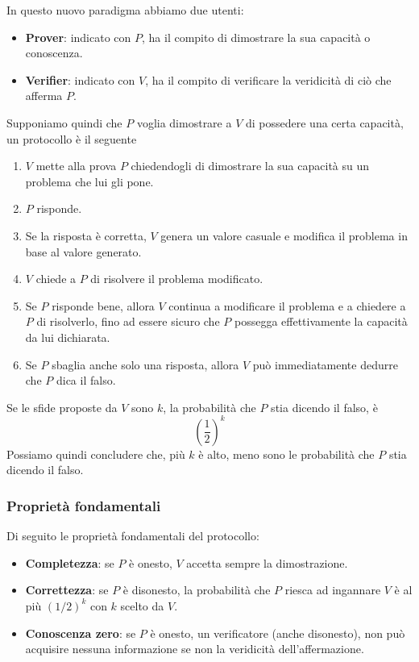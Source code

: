In questo nuovo paradigma abbiamo due utenti:
\begin{itemize}
	\item \textbf{Prover}: indicato con $P$, ha il compito di dimostrare la sua capacit\`a o conoscenza.
	\item \textbf{Verifier}: indicato con $V$, ha il compito di verificare la veridicit\`a di ci\`o che afferma $P$.
\end{itemize}
Supponiamo quindi che $P$ voglia dimostrare a $V$ di possedere una certa capacit\`a, un protocollo \`e il seguente
\begin{enumerate}
	\item $V$ mette alla prova $P$ chiedendogli di dimostrare la sua capacit\`a su un problema che lui gli pone.
	\item $P$ risponde.
	\item Se la risposta \`e corretta, $V$ genera un valore casuale e modifica il problema in base al valore generato.
	\item $V$ chiede a $P$ di risolvere il problema modificato.
	\item Se $P$ risponde bene, allora $V$ continua a modificare il problema e a chiedere a $P$ di risolverlo, fino ad
	      essere sicuro che $P$ possegga effettivamente la capacit\`a da lui dichiarata.
	\item Se $P$ sbaglia anche solo una risposta, allora $V$ pu\`o immediatamente dedurre che $P$ dica il falso.
\end{enumerate}
Se le sfide proposte da $V$ sono $k$, la probabilit\`a che $P$ stia dicendo il falso, \`e
\[ \left( \frac{1}{2} \right)^k \]
Possiamo quindi concludere che, pi\`u $k$ \`e alto, meno sono le probabilit\`a che $P$ stia dicendo il falso.

\subsubsection{Propriet\`a fondamentali}
Di seguito le propriet\`a fondamentali del protocollo:
\begin{itemize}
	\item \textbf{Completezza}: se $P$ \`e onesto, $V$ accetta sempre la dimostrazione.
	\item \textbf{Correttezza}: se $P$ \`e disonesto, la probabilit\`a che $P$ riesca ad ingannare $V$ \`e al pi\`u
	      $(1/2)^k$ con $k$ scelto da $V$.
	\item \textbf{Conoscenza zero}: se $P$ \`e onesto, un verificatore (anche disonesto), non pu\`o acquisire nessuna
	      informazione se non la veridicit\`a dell'affermazione.
\end{itemize}

